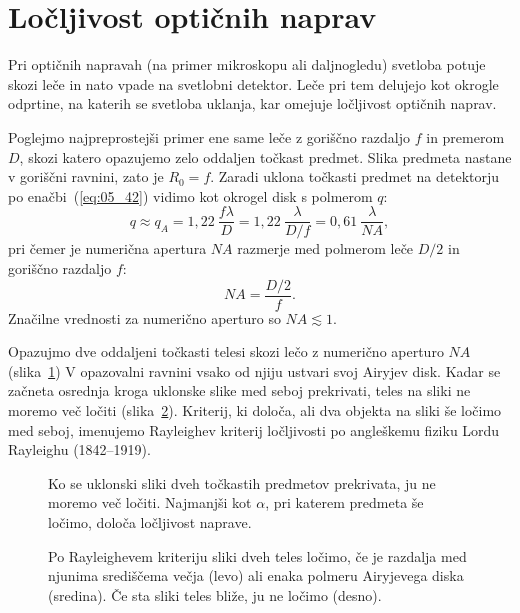 \section{Ločljivost optičnih naprav}
Pri optičnih napravah (na primer mikroskopu ali daljnogledu) 
svetloba potuje skozi leče in nato vpade na svetlobni detektor. Leče pri tem delujejo
kot okrogle odprtine, na katerih se svetloba uklanja, kar omejuje ločljivost 
optičnih naprav.

Poglejmo najpreprostejši primer ene same leče z goriščno razdaljo $f$ in premerom $D$,
skozi katero opazujemo zelo oddaljen točkast predmet. Slika predmeta 
nastane v goriščni ravnini, zato je $R_0=f$. Zaradi uklona točkasti predmet na 
detektorju po enačbi~(\ref{eq:05_42}) vidimo kot okrogel disk s polmerom $q$:
\begin{equation}
q \approx q_A = 1,22~\frac{f\lambda}{D} = 1,22~\frac{\lambda}{D/f} = 0,61~\frac{\lambda}{NA},
\label{eq:05_43}
\end{equation}
pri čemer je numerična apertura $NA$ razmerje med polmerom leče $D/2$
in goriščno razdaljo $f$:
\begin{equation}
NA = \frac{D/2}{f}.
\label{eq:05_44}
\end{equation}
Značilne vrednosti za numerično aperturo so $NA \lesssim 1$.

Opazujmo dve oddaljeni točkasti telesi skozi lečo z numerično aperturo $NA$ 
(slika~\ref{fig:05_locljivost})
V opazovalni ravnini vsako od njiju ustvari svoj Airyjev disk. Kadar se začneta osrednja
kroga uklonske slike med seboj prekrivati, teles na sliki ne moremo več ločiti 
(slika~\ref{fig:05_locljivost2}). Kriterij, ki določa,
ali dva objekta na sliki še ločimo med seboj, imenujemo
Rayleighev kriterij ločljivosti po angleškemu fiziku Lordu Rayleighu (1842--1919). 
\begin{figure}[ht]
\centering
\def\svgwidth{120truemm} 

\caption{Ko se uklonski sliki dveh točkastih predmetov prekrivata, ju ne moremo več ločiti.
Najmanjši kot $\alpha$, pri katerem predmeta še ločimo, določa ločljivost naprave.}
\label{fig:05_locljivost}
\end{figure}

\begin{figure}[ht]
\centering
\def\svgwidth{120truemm} 

\caption{Po Rayleighevem kriteriju sliki dveh teles ločimo, če je razdalja med
njunima središčema večja (levo) ali enaka polmeru Airyjevega diska (sredina). Če 
sta sliki teles bliže, ju ne ločimo (desno).}
\label{fig:05_locljivost2}
\end{figure}

